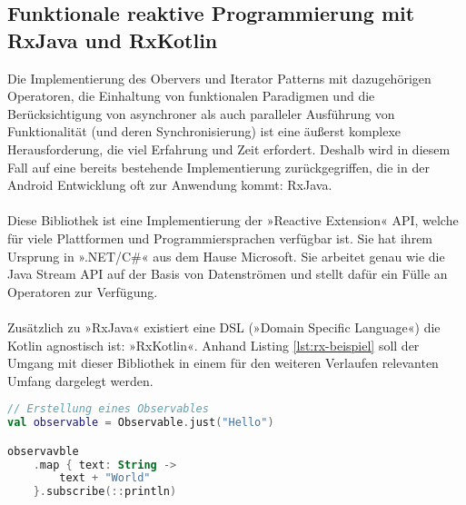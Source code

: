 \subsection{Funktionale reaktive Programmierung mit RxJava und RxKotlin}
Die Implementierung des Obervers und Iterator Patterns mit dazugehörigen Operatoren, die Einhaltung von funktionalen Paradigmen und die Berücksichtigung von asynchroner als auch paralleler Ausführung von Funktionalität (und deren Synchronisierung) ist eine äußerst komplexe Herausforderung, die viel Erfahrung und Zeit erfordert. Deshalb wird in diesem Fall auf eine bereits bestehende Implementierung zurückgegriffen, die in der Android Entwicklung oft zur Anwendung kommt: RxJava.
\\\\
Diese Bibliothek ist eine Implementierung der »Reactive Extension« API, welche für viele Plattformen und Programmiersprachen verfügbar ist. Sie hat ihrem Ursprung in ».NET/C\#« aus dem Hause Microsoft. Sie arbeitet genau wie die Java Stream API auf der Basis von Datenströmen und stellt dafür ein Fülle an Operatoren zur Verfügung.
\\\\
Zusätzlich zu »RxJava« existiert eine DSL (»Domain Specific Language«) die Kotlin agnostisch ist: »RxKotlin«.
Anhand Listing
\ref{lst:rx-beispiel}
soll der Umgang mit dieser Bibliothek in einem für den weiteren Verlaufen relevanten Umfang dargelegt werden.
\begin{lstlisting}[caption={RxJava/Kotlin Beispiel}, label={lst:rx-beispiel}, language=Kotlin]
// Erstellung eines Observables
val observable = Observable.just("Hello")

observavble
	.map { text: String ->
		text + "World"
	}.subscribe(::println)
\end{lstlisting}

